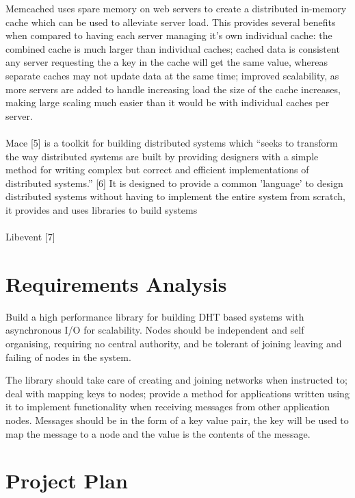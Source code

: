 \documentclass{article}
\begin{document}
Memcached uses spare memory on web servers to create a distributed in-memory cache which can be used to alleviate server load. This provides several benefits when compared to having each server managing it's own individual cache: the combined cache is much larger than individual caches; cached data is consistent any server requesting the a key in the cache will get the same value, whereas separate caches may not update data at the same time; improved scalability, as more servers are added to handle increasing load the size of the cache increases, making large scaling much easier than it would be with individual caches per server.
\\
\\
Mace [5] is a toolkit for building distributed systems which “seeks to transform the way distributed systems are built by providing designers with a simple method for writing complex but correct and efficient implementations of distributed systems.” [6] It is designed to provide a common 'language' to design distributed systems without having to implement the entire system from scratch, it provides and uses libraries to build systems
\\
\\
Libevent [7]


\section{Requirements Analysis}
Build a high performance library for building DHT based systems with asynchronous I/O for scalability. Nodes should be independent and self organising, requiring no central authority, and be tolerant of joining leaving and failing of nodes in the system.

The library should take care of creating and joining networks when instructed to; deal with mapping keys to nodes; provide a method for applications written using it to implement functionality when receiving messages from other application nodes. Messages should be in the form of a key value pair, the key will be used to map the message to a node and the value is the contents of the message.
\section{Project Plan}
\end{document}
